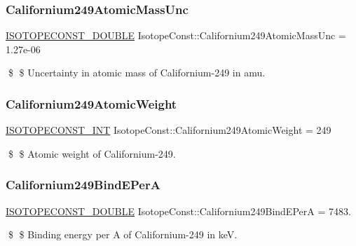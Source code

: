 \subsubsection{\texorpdfstring{Californium249\+Atomic\+Mass\+Unc}{Californium249AtomicMassUnc}}
{\footnotesize\ttfamily \mbox{\hyperlink{group___isotope_const-_macros_ga8f45a7272ce02c0b4c65c44636ed719a}{I\+S\+O\+T\+O\+P\+E\+C\+O\+N\+S\+T\+\_\+\+D\+O\+U\+B\+LE}} Isotope\+Const\+::\+Californium249\+Atomic\+Mass\+Unc = 1.\+27e-\/06}

\$ \$ Uncertainty in atomic mass of Californium-\/249 in amu. \mbox{\label{group___isotope_const-_californium-_cf249_ga6fa7897278c3f6918135680eb1596fe0}} 
\subsubsection{\texorpdfstring{Californium249\+Atomic\+Weight}{Californium249AtomicWeight}}
{\footnotesize\ttfamily \mbox{\hyperlink{group___isotope_const-_macros_ga5f18360b3e99483a35c32d789e62621c}{I\+S\+O\+T\+O\+P\+E\+C\+O\+N\+S\+T\+\_\+\+I\+NT}} Isotope\+Const\+::\+Californium249\+Atomic\+Weight = 249}

\$ \$ Atomic weight of Californium-\/249. \mbox{\label{group___isotope_const-_californium-_cf249_gaa965858ee5d139be47ee9a37759542ab}} 
\subsubsection{\texorpdfstring{Californium249\+Bind\+E\+PerA}{Californium249BindEPerA}}
{\footnotesize\ttfamily \mbox{\hyperlink{group___isotope_const-_macros_ga8f45a7272ce02c0b4c65c44636ed719a}{I\+S\+O\+T\+O\+P\+E\+C\+O\+N\+S\+T\+\_\+\+D\+O\+U\+B\+LE}} Isotope\+Const\+::\+Californium249\+Bind\+E\+PerA = 7483.}

\$ \$ Binding energy per A of Californium-\/249 in keV. \mbox{\label{group___isotope_const-_californium-_cf249_gafdbdb3c66273cc923abcbab497675092}} 
